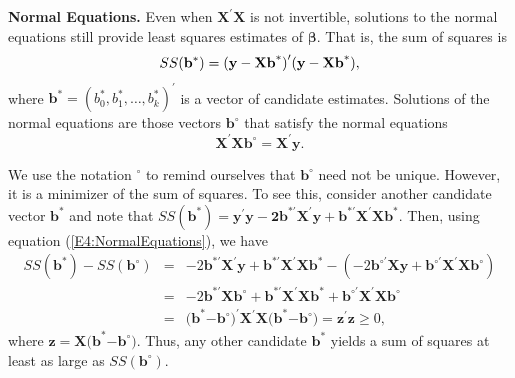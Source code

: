 \textbf{Normal Equations.} Even when $\mathbf{X}^{\prime}\mathbf{X}$
is not invertible, solutions to the normal equations still provide
least squares estimates of $\boldsymbol \beta $. That is, the sum of
squares is
\begin{equation*}
SS(\mathbf{b}^{\ast})=\mathbf{(y-Xb}^{\ast}\mathbf{)}^{\prime}\mathbf{%
(y-Xb}^{\ast}\mathbf{),}
\end{equation*}
where
$\mathbf{b}^{\ast}=(b_0^{\ast},b_1^{\ast},\ldots,b_k^{\ast})^{\prime}$
is a vector of candidate estimates. Solutions of the normal
equations are those vectors $\mathbf{b}^{\circ }$ that satisfy the
normal equations
\begin{equation}\label{E4:NormalEquations}
\mathbf{X}^{\prime}\mathbf{Xb}^{\circ }=\mathbf{X}^{\prime}\mathbf{y.}%
\end{equation}

\noindent We use the notation $^{\circ }$ to remind ourselves that
$\mathbf{b}^{\circ }$ need not be unique. However, it is a minimizer
of the sum of squares. To see
this, consider another candidate vector $\mathbf{b}^{\ast}$ and note that $SS(%
\mathbf{b}^{\ast})=\mathbf{y}^{\prime}\mathbf{y-2b}^{\ast \prime }\mathbf{X%
}^{\prime}\mathbf{y+b}^{\ast \prime
}\mathbf{X}^{\prime}\mathbf{Xb}^{\ast} $. Then, using equation
(\ref{E4:NormalEquations}), we have
\begin{eqnarray*}
SS(\mathbf{b}^{\ast})-SS(\mathbf{b}^{\circ }) &=&-2\mathbf{b}^{\ast \prime }%
\mathbf{X}^{\prime}\mathbf{y}+\mathbf{b}^{\ast \prime }\mathbf{X}^{\prime}%
\mathbf{Xb}^{\ast}-(-2\mathbf{b}^{\circ \prime }\mathbf{Xy}+\mathbf{b}%
^{\circ \prime }\mathbf{X}^{\prime}\mathbf{Xb}^{\circ }) \\
&=&-2\mathbf{b}^{\ast \prime }\mathbf{Xb}^{\circ }+\mathbf{b}^{\ast \prime }%
\mathbf{X}^{\prime}\mathbf{Xb}^{\ast}+\mathbf{b}^{\circ \prime }\mathbf{X}%
^{\prime}\mathbf{Xb}^{\circ } \\
&=&\mathbf{(b}^{\ast}\mathbf{-b}^{\circ }\mathbf{)}^{\prime}\mathbf{X}%
^{\prime}\mathbf{X(b}^{\ast}\mathbf{-b}^{\circ }\mathbf{)}=\mathbf{z}%
^{\prime}\mathbf{z}\geq 0,
\end{eqnarray*}
\noindent where $\mathbf{z}=\mathbf{X(b}^{\ast}\mathbf{-b}^{\circ
}\mathbf{)}$. Thus, any other candidate $\mathbf{b}^{\ast}$ yields a
sum of squares at least as large as $SS(\mathbf{b}^{\circ })$.

